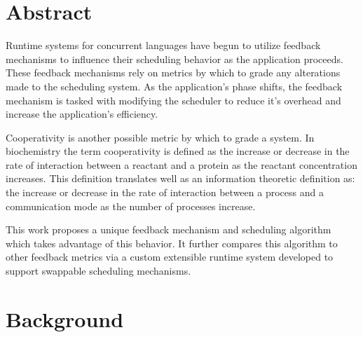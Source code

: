 \newcommand{\etc} {\emph{etc.\/}}
\newcommand{\etal}{\emph{et~al.\/}}
\newcommand{\eg}  {\emph{e.g.\/}}
\newcommand{\ie}  {\emph{i.e.\/}}


\section*{Abstract}
Runtime systems for concurrent languages have begun to utilize feedback mechanisms to influence their
scheduling behavior as the application proceeds. These feedback mechanisms rely on metrics by which to
grade any alterations made to the scheduling system. As the application's phase shifts, the feedback mechanism
is tasked with modifying the scheduler to reduce it's overhead and increase the application's efficiency.

Cooperativity is another possible metric by which to grade a system. In biochemistry the term cooperativity
is defined as the increase or decrease in the rate of interaction between a reactant and a protein as
the reactant concentration increases. This definition translates well as an information theoretic definition
as: the increase or decrease in the rate of interaction between a process and a communication mode as the
number of processes increase. 

This work proposes a unique feedback mechanism and scheduling algorithm which takes advantage of this behavior.
It further compares this algorithm to other feedback metrics via a custom extensible runtime system developed to
support swappable scheduling mechanisms.
\vfill{}

\setcounter{page}{0} 
\newpage{}

\section{Background} %


